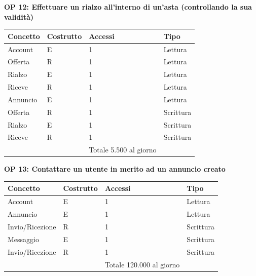 \documentclass[a4paper,12pt]{report}
\begin{document}
            \textbf{OP 12: Effettuare un rialzo all’interno di un’asta (controllando la sua validità)}
        	\begin{table}[h!]
            \centering
             \begin{tabular}{||l l l l||}
             \hline
             Concetto & Costrutto & Accessi & Tipo \\ [0.5ex] 
             \hline\hline
             Account & E & 1 & Lettura \\ 
             Offerta & R & 1 & Lettura \\ 
             Rialzo & E & 1 & Lettura \\ 
             Riceve & R & 1 & Lettura \\ 
             Annuncio & E & 1 & Lettura \\ 
             Offerta & R & 1 & Scrittura \\ 
             Rialzo & E & 1 & Scrittura \\ 
             Riceve & R & 1 & Scrittura \\ 
             \hline
                &   & Totale  5.500 al giorno &  \\ [1ex] 
             \hline
             \end{tabular}
            \end{table}

            \textbf{OP 13: Contattare un utente in merito ad un annuncio creato}
        	\begin{table}[h!]
            \centering
             \begin{tabular}{||l l l l||}
             \hline
             Concetto & Costrutto & Accessi & Tipo \\ [0.5ex] 
             \hline\hline
             Account & E & 1 & Lettura \\ 
             Annuncio & E & 1 & Lettura \\ 
             Invio/Ricezione & R & 1 & Scrittura \\ 
             Messaggio & E & 1 & Scrittura \\ 
             Invio/Ricezione & R & 1 & Scrittura \\ 
             \hline
                &   & Totale  120.000 al giorno &  \\ [1ex] 
             \hline
             \end{tabular}
            \end{table}
\end{document}
